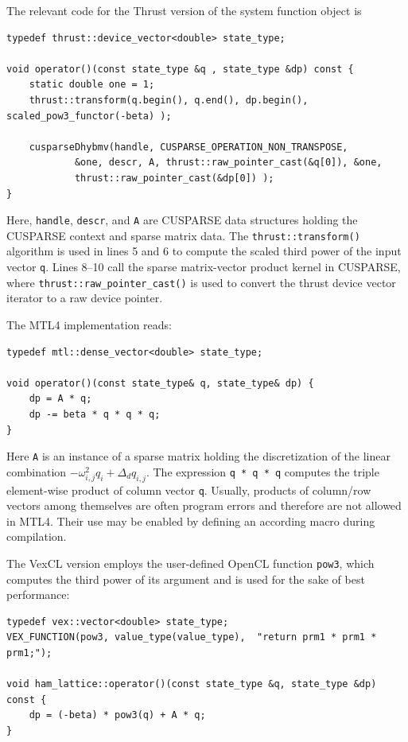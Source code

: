 \documentclass[final]{siamltex}
\newcommand{\code}[1]{\lstinline$#1$}
\begin{document}
The relevant code for the Thrust version of the system function object is
\begin{lstlisting}
typedef thrust::device_vector<double> state_type;

void operator()(const state_type &q , state_type &dp) const {
    static double one = 1;
    thrust::transform(q.begin(), q.end(), dp.begin(), scaled_pow3_functor(-beta) );

    cusparseDhybmv(handle, CUSPARSE_OPERATION_NON_TRANSPOSE,
            &one, descr, A, thrust::raw_pointer_cast(&q[0]), &one,
            thrust::raw_pointer_cast(&dp[0]) );
}
\end{lstlisting}
Here, \code{handle}, \code{descr}, and \code{A} are CUSPARSE data structures
holding the CUSPARSE context and sparse matrix data. The
\code{thrust::transform()} algorithm is used in lines 5 and 6 to compute the
scaled third power of the input vector \code{q}. Lines 8--10 call the sparse
matrix-vector product kernel in CUSPARSE, where
\code{thrust::raw_pointer_cast()} is used to convert the thrust device vector
iterator to a raw device pointer.

The MTL4 implementation reads:
\begin{lstlisting}
typedef mtl::dense_vector<double> state_type;

void operator()(const state_type& q, state_type& dp) {
    dp = A * q;
    dp -= beta * q * q * q;
}
\end{lstlisting}
Here \code{A} is an instance of a sparse matrix holding the discretization of
the linear combination $- \omega_{i,j}^2 q_i + \Delta_d q_{i,j}$. The
expression \code{q * q * q} computes the triple element-wise product of column
vector \code{q}.  Usually, products of column/row vectors among themselves are
often program errors and therefore are not allowed in MTL4.  Their use may be
enabled by defining an according macro during compilation.

The VexCL version employs the user-defined OpenCL function \code{pow3}, which
computes the third power of its argument and is used for the sake of best
performance:
\begin{lstlisting}
typedef vex::vector<double> state_type;
VEX_FUNCTION(pow3, value_type(value_type),  "return prm1 * prm1 * prm1;");

void ham_lattice::operator()(const state_type &q, state_type &dp) const {
    dp = (-beta) * pow3(q) + A * q;
}
\end{lstlisting}
\end{document}
